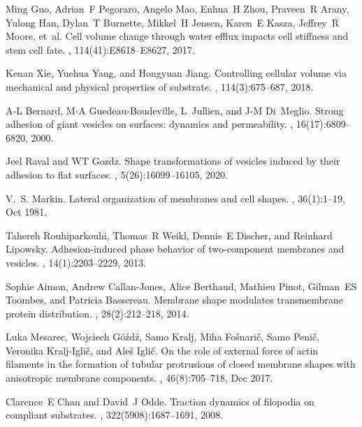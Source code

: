 \documentclass[pre,amsmath]{revtex4}
\begin{document}
\begin{thebibliography}{10}
Ming Guo, Adrian~F Pegoraro, Angelo Mao, Enhua~H Zhou, Praveen~R Arany, Yulong
  Han, Dylan~T Burnette, Mikkel~H Jensen, Karen~E Kasza, Jeffrey~R Moore,
  et~al.
\newblock Cell volume change through water efflux impacts cell stiffness and
  stem cell fate.
,
  114(41):E8618--E8627, 2017.

Kenan Xie, Yuehua Yang, and Hongyuan Jiang.
\newblock Controlling cellular volume via mechanical and physical properties of
  substrate.
, 114(3):675--687, 2018.

A-L Bernard, M-A Guedeau-Boudeville, L~Jullien, and J-M Di~Meglio.
\newblock Strong adhesion of giant vesicles on surfaces: dynamics and
  permeability.
, 16(17):6809--6820, 2000.

Jeel Raval and WT Gozdz.
\newblock Shape transformations of vesicles induced by their adhesion to flat
  surfaces.
, 5(26):16099--16105, 2020.

V.~S. Markin.
\newblock Lateral organization of membranes and cell shapes.
, 36(1):1--19, Oct 1981.

Tahereh Rouhiparkouhi, Thomas~R Weikl, Dennis~E Discher, and Reinhard Lipowsky.
\newblock Adhesion-induced phase behavior of two-component membranes and
  vesicles.
, 14(1):2203--2229,
  2013.

Sophie Aimon, Andrew Callan-Jones, Alice Berthaud, Mathieu Pinot, Gilman~ES
  Toombes, and Patricia Bassereau.
\newblock Membrane shape modulates transmembrane protein distribution.
, 28(2):212--218, 2014.

Luka Mesarec, Wojciech G{\'o}{\'{z}}d{\'{z}}, Samo Kralj, Miha
  Fo{\v{s}}nari{\v{c}}, Samo Peni{\v{c}}, Veronika Kralj-Igli{\v{c}}, and
  Ale{\v{s}} Igli{\v{c}}.
\newblock On the role of external force of actin filaments in the formation of
  tubular protrusions of closed membrane shapes with anisotropic membrane
  components.
, 46(8):705--718, Dec 2017.

Clarence~E Chan and David~J Odde.
\newblock Traction dynamics of filopodia on compliant substrates.
, 322(5908):1687--1691, 2008.


\end{thebibliography}
\end{document}
